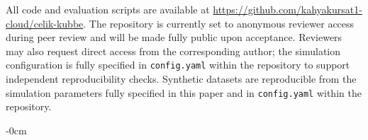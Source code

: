 \documentclass[drones,article,submit,pdftex]{Definitions/mdpi}
\begin{document}
All code and evaluation scripts are available at
\url{https://github.com/kahyakursat1-cloud/celik-kubbe}.
The repository is currently set to anonymous reviewer access during peer review
and will be made fully public upon acceptance.
Reviewers may also request direct access from the corresponding author;
the simulation configuration is fully specified in \texttt{config.yaml}
within the repository to support independent reproducibility checks.
Synthetic datasets are reproducible from the simulation parameters fully specified
in this paper and in \texttt{config.yaml} within the repository.




\begin{adjustwidth}{-\extralength}{0cm}

\end{adjustwidth}
\end{document}
